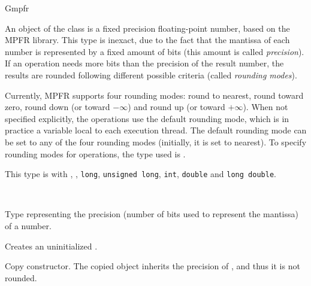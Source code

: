\begin{ccRefClass} {Gmpfr}
\label{Gmpfr}

\ccDefinition

An object of the class  is a fixed precision floating-point
number, based on the MPFR library. This type is inexact, due to the fact
that the mantissa of each number is represented by a fixed amount of bits
(this amount is called \emph{precision}). If an operation needs more bits
than the precision of the result number, the results are rounded following
different possible criteria (called \emph{rounding modes}).

Currently, MPFR supports four rounding modes: round to nearest,
round toward zero, round down (or toward \(-\infty\)) and round up
(or toward \(+\infty\)).  When not specified explicitly, the
operations use the default rounding mode, which is in practice a
variable local to each execution thread. The default rounding mode
can be set to any of the four rounding modes (initially, it is set
to nearest). To specify rounding modes for operations, the type
used is .

This type is  with , ,
\verb-long-, \verb-unsigned long-, \verb-int-, \verb-double- and
\verb-long double-.


\ccIsModel
{}\\

\ccTypes

                {Type representing the precision (number of bits
                used to represent the mantissa) of a number.}

\ccCreation
{}

        {Creates an uninitialized  \ccVar.}

        {Copy constructor. The copied object inherits the precision of
        , and thus it is not rounded.}



\end{ccRefClass}
